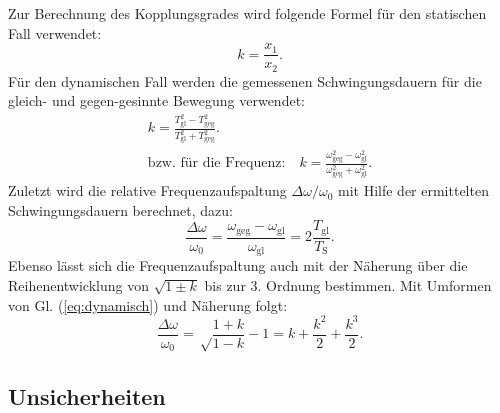 \documentclass[11pt,a4paper,titlepage, ngerman]{article}
\newcommand{\refeq}[1]{Gl. (\ref{eq:#1})}
\begin{document}
			Zur Berechnung des Kopplungsgrades wird folgende Formel für den statischen Fall verwendet: 
			\begin{equation}
				k = \frac{x_1}{x_2}. \label{eq:statisch}
			\end{equation}
			Für den dynamischen Fall werden die gemessenen Schwingungsdauern für die gleich- und gegen-gesinnte Bewegung verwendet:
			\begin{align}
				k = \frac{T_\text{gl}^2-T_\text{geg}^2}{T_\text{gl}^2+T_\text{geg}^2}. \label{eq:dynamisch} \\
				\text{bzw. für die Frequenz:} \quad k = \frac{\omega_\text{geg}^2-\omega_\text{gl}^2}{\omega_\text{geg}^2+\omega_\text{gl}^2}.
			\end{align}
			Zuletzt wird die relative Frequenzaufspaltung $\Delta\omega / \omega_0$ mit Hilfe der ermittelten Schwingungsdauern berechnet, dazu:
			\begin{equation}
				\frac{\Delta\omega}{\omega_0} = \frac{\omega_\text{geg}-\omega_\text{gl}}{\omega_\text{gl}} = 2\frac{T_\text{gl}}{T_\text{S}}. \label{eq:freqfrac} 	
			\end{equation}		
			Ebenso lässt sich die Frequenzaufspaltung auch mit der Näherung über die Reihenentwicklung von $\sqrt{1\pm k}$ bis zur 3. Ordnung bestimmen. Mit Umformen von \refeq{dynamisch} und Näherung folgt:
			\begin{equation}
				\frac{\Delta\omega}{\omega_0} = \sqrt\frac{1+k}{1-k}-1 = k + \frac{k^2}{2} + \frac{k^3}{2}. \label{eq:freqfrac2} 
			\end{equation}
		
		\newpage			
		\subsection*{Unsicherheiten}
			
\end{document}
